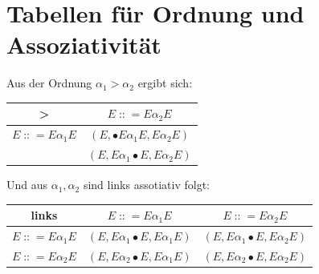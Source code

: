 \documentclass[t]{beamer}
\renewcommand{\Coloneqq}{\mathrel{\mathop{::}}=}
\begin{document}
	\section{Tabellen für Ordnung und Assoziativität}\label{sec:tabellen-fur-ordnung-und-assotiativitat}
	\begin{frame}
		Aus der Ordnung $ \alpha_{1} > \alpha_{2}$ ergibt sich:
		\begin{table}[h]
			\centering
			\begin{tabular}{|c|c|}
				\hline
				>                      & $E \Coloneqq E\alpha_{2}E$                   \\
				\hline
				$E \Coloneqq E\alpha_{1}E$ & $(E, \bullet{E}\alpha_{1}E, {E}\alpha_{2}E)$ \\
				& $(E, E\alpha_{1}\bullet{E}, E\alpha_{2}E)$   \\
				\hline
			\end{tabular}\label{tab:table}
		\end{table}
		\smallskip
		Und aus $\alpha_{1}, \alpha_{2}$ sind links assotiativ folgt:
		\begin{table}[h]
			\centering
			\begin{tabular}{|c|c|c|}
				\hline
				links                  & $E \Coloneqq E\alpha_{1}E$                 & $E \Coloneqq E\alpha_{2}E$                 \\
				\hline
				$E \Coloneqq E\alpha_{1}E$ & $(E, E\alpha_{1}\bullet{E}, E\alpha_{1}E)$ & $(E, E\alpha_{1}\bullet{E}, E\alpha_{2}E)$ \\
				\hline
				$E \Coloneqq E\alpha_{2}E$ & $(E, E\alpha_{2}\bullet{E}, E\alpha_{1}E)$ & $(E, E\alpha_{2}\bullet{E}, E\alpha_{2}E)$ \\
				\hline
			\end{tabular}\label{tab:table2}
		\end{table}
	\end{frame}
\end{document}
